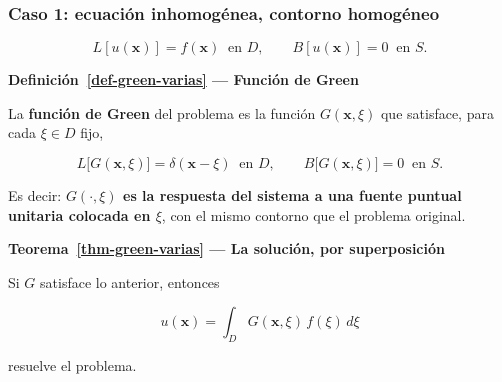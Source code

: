 \documentclass[
  spanish,
  a4paper,
]{scrbook}
\theoremstyle{definition}
\theoremstyle{plain}
\theoremstyle{definition}
\theoremstyle{plain}
\theoremstyle{definition}
\theoremstyle{remark}
\begin{document}
\subsubsection{Caso 1: ecuación inhomogénea, contorno
homogéneo}\label{caso-1-ecuaciuxf3n-inhomoguxe9nea-contorno-homoguxe9neo}

\[
L[u(\mathbf{x})] = f(\mathbf{x}) \ \text{ en } D, \qquad
B[u(\mathbf{x})] = 0 \ \text{ en } S .
\]

\begin{tcolorbox}[enhanced jigsaw, arc=.35mm, bottomrule=.15mm, breakable, colback=white, colframe=quarto-callout-note-color-frame, left=2mm, leftrule=.75mm, opacityback=0, rightrule=.15mm, toprule=.15mm]
\begin{minipage}[t]{5.5mm}
\textcolor{quarto-callout-note-color}{\faInfo}
\end{minipage}%
\begin{minipage}[t]{\textwidth - 5.5mm}

\vspace{-3mm}\textbf{Definición~\ref{def-green-varias} --- Función de Green}\vspace{3mm}

La \textbf{función de Green} del problema es la función
\(G(\mathbf{x},\xi)\) que satisface, para cada \(\xi \in D\) fijo,

\[
L\big[G(\mathbf{x},\xi)\big] = \delta(\mathbf{x}-\xi) \ \text{ en } D, \qquad
B\big[G(\mathbf{x},\xi)\big] = 0 \ \text{ en } S .
\]

Es decir: \textbf{\(G(\cdot,\xi)\) es la respuesta del sistema a una
fuente puntual unitaria colocada en \(\xi\)}, con el mismo contorno que
el problema original.

\end{minipage}%
\end{tcolorbox}

\begin{tcolorbox}[enhanced jigsaw, arc=.35mm, bottomrule=.15mm, breakable, colback=white, colframe=quarto-callout-note-color-frame, left=2mm, leftrule=.75mm, opacityback=0, rightrule=.15mm, toprule=.15mm]
\begin{minipage}[t]{5.5mm}
\textcolor{quarto-callout-note-color}{\faInfo}
\end{minipage}%
\begin{minipage}[t]{\textwidth - 5.5mm}

\vspace{-3mm}\textbf{Teorema~\ref{thm-green-varias} --- La solución, por superposición}\vspace{3mm}

Si \(G\) satisface lo anterior, entonces

\[
u(\mathbf{x}) = \int_D G(\mathbf{x},\xi)\,f(\xi)\,d\xi
\]

resuelve el problema.

\end{minipage}%
\end{tcolorbox}
\end{document}
